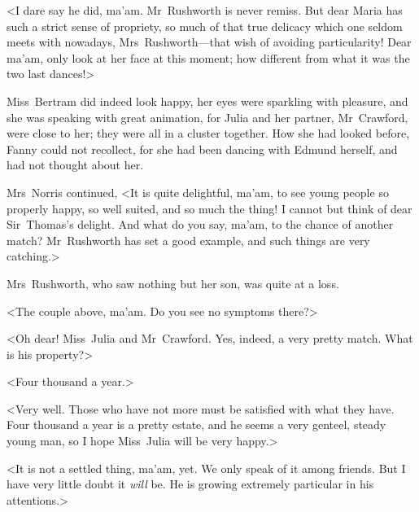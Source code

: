 <I dare say he did, ma'am. Mr~Rushworth is never remiss. But dear Maria has such a strict sense of propriety, so much of that true delicacy which one seldom meets with nowadays, Mrs~Rushworth—that wish of avoiding particularity! Dear ma'am, only look at her face at this moment; how different from what it was the two last dances!>

Miss~Bertram did indeed look happy, her eyes were sparkling with pleasure, and she was speaking with great animation, for Julia and her partner, Mr~Crawford, were close to her; they were all in a cluster together. How she had looked before, Fanny could not recollect, for she had been dancing with Edmund herself, and had not thought about her.

Mrs~Norris continued, <It is quite delightful, ma'am, to see young people so properly happy, so well suited, and so much the thing! I cannot but think of dear Sir~Thomas's delight. And what do you say, ma'am, to the chance of another match? Mr~Rushworth has set a good example, and such things are very catching.>

Mrs~Rushworth, who saw nothing but her son, was quite at a loss.

<The couple above, ma'am. Do you see no symptoms there?>

<Oh dear! Miss~Julia and Mr~Crawford. Yes, indeed, a very pretty match. What is his property?>

<Four thousand a year.>

<Very well. Those who have not more must be satisfied with what they have. Four thousand a year is a pretty estate, and he seems a very genteel, steady young man, so I hope Miss~Julia will be very happy.>

<It is not a settled thing, ma'am, yet. We only speak of it among friends. But I have very little doubt it \textit{will}  be. He is growing extremely particular in his attentions.>

